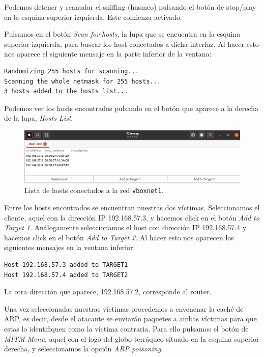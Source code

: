 \documentclass[11pt]{article}
\begin{document}
Podemos detener y reanudar el sniffing (husmeo) pulsando el botón de stop/play en la esquina
 superior izquierda. Este comienza activado.
 
Pulsamos en el botón \textit{Scan for hosts}, la lupa que se encuentra en la esquina superior izquierda, para buscar los host conectados a dicha interfaz. Al hacer esto nos aparece el siguiente mensaje en la parte inferior de la ventana:

\begin{Verbatim}[tabsize=4]
Randomizing 255 hosts for scanning...
Scanning the whole netmask for 255 hosts...
3 hosts added to the hosts list...
\end{Verbatim}

Podemos ver los hosts encontrados pulsando en el botón que aparece a la derecha de la lupa, \textit{Hosts List}.

\begin{figure}[H]
	\centering
	\includegraphics[width=140mm]{images/host-list}
	\caption{Lista de hosts conectados a la red \texttt{vboxnet1}.}
	\label{fig:host-list}
\end{figure}


Entre los hosts encontrados se encuentran nuestras dos víctimas. Seleccionamos el cliente, aquel con la dirección IP 192.168.57.3, y hacemos click en el botón \textit{Add to Target 1}. Análogamente seleccionamos el host con dirección IP 192.168.57.4 y hacemos click en el botón \textit{Add to Target 2}. Al hacer esto nos aparecen los siguientes mensajes en la ventana inferior.

\begin{Verbatim}
Host 192.168.57.3 added to TARGET1
Host 192.168.57.4 added to TARGET2
\end{Verbatim}

La otra dirección que aparece, 192.168.57.2, corresponde al router.

Una vez seleccionadas nuestras víctimas procedemos a envenenar la caché de ARP, es decir, desde el atacante se enviarán paquetes a ambas víctimas para que estas lo identifiquen como la víctima contraria. Para ello pulsamos el botón de \textit{MITM Menu}, aquel con el logo del globo terráqueo situado en la esquina superior derecha, y seleccionamos la opción \textit{ARP poisoning}. 
\end{document}
